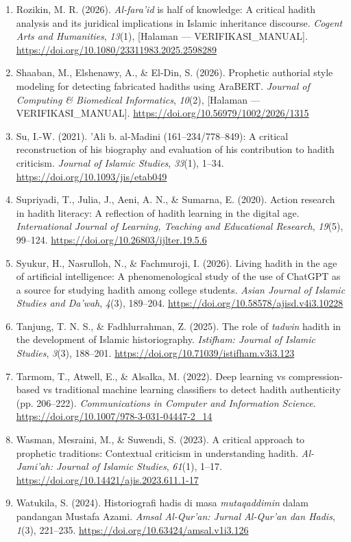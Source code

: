 \begin{enumerate}[leftmargin=1.5cm,itemindent=-1.5cm,label={},itemsep=4pt,parsep=2pt]
    \item Rozikin, M. R. (2026). \textit{Al-fara'id} is half of knowledge: A critical hadith analysis and its juridical implications in Islamic inheritance discourse. \textit{Cogent Arts and Humanities}, \textit{13}(1), [Halaman --- VERIFIKASI\_MANUAL]. \url{https://doi.org/10.1080/23311983.2025.2598289}
    \item Shaaban, M., Elshenawy, A., \& El-Din, S. (2026). Prophetic authorial style modeling for detecting fabricated hadiths using AraBERT. \textit{Journal of Computing \& Biomedical Informatics}, \textit{10}(2), [Halaman --- VERIFIKASI\_MANUAL]. \url{https://doi.org/10.56979/1002/2026/1315}
    \item Su, I.-W. (2021). 'Ali b. al-Madini (161--234/778--849): A critical reconstruction of his biography and evaluation of his contribution to hadith criticism. \textit{Journal of Islamic Studies}, \textit{33}(1), 1--34. \url{https://doi.org/10.1093/jis/etab049}
    \item Supriyadi, T., Julia, J., Aeni, A. N., \& Sumarna, E. (2020). Action research in hadith literacy: A reflection of hadith learning in the digital age. \textit{International Journal of Learning, Teaching and Educational Research}, \textit{19}(5), 99--124. \url{https://doi.org/10.26803/ijlter.19.5.6}
    \item Syukur, H., Nasrulloh, N., \& Fachmuroji, I. (2026). Living hadith in the age of artificial intelligence: A phenomenological study of the use of ChatGPT as a source for studying hadith among college students. \textit{Asian Journal of Islamic Studies and Da'wah}, \textit{4}(3), 189--204. \url{https://doi.org/10.58578/ajisd.v4i3.10228}
    \item Tanjung, T. N. S., \& Fadhlurrahman, Z. (2025). The role of \textit{tadwin} hadith in the development of Islamic historiography. \textit{Istifham: Journal of Islamic Studies}, \textit{3}(3), 188--201. \url{https://doi.org/10.71039/istifham.v3i3.123}
    \item Tarmom, T., Atwell, E., \& Alsalka, M. (2022). Deep learning vs compression-based vs traditional machine learning classifiers to detect hadith authenticity (pp. 206--222). \textit{Communications in Computer and Information Science}. \url{https://doi.org/10.1007/978-3-031-04447-2_14}
    \item Wasman, Mesraini, M., \& Suwendi, S. (2023). A critical approach to prophetic traditions: Contextual criticism in understanding hadith. \textit{Al-Jami'ah: Journal of Islamic Studies}, \textit{61}(1), 1--17. \url{https://doi.org/10.14421/ajis.2023.611.1-17}
    \item Watukila, S. (2024). Historiografi hadis di masa \textit{mutaqaddimin} dalam pandangan Mustafa Azami. \textit{Amsal Al-Qur'an: Jurnal Al-Qur'an dan Hadis}, \textit{1}(3), 221--235. \url{https://doi.org/10.63424/amsal.v1i3.126}
\end{enumerate}
